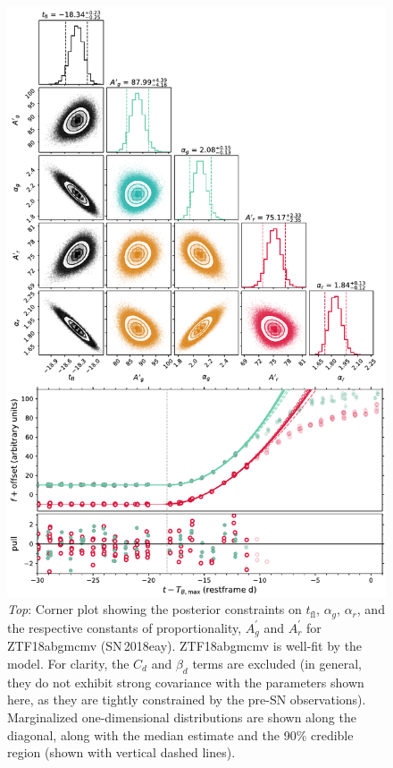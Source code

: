 \documentclass[twocolumn]{./aastex63}
\newcommand{\tfl}{$t_\mathrm{fl}$}
\begin{document}
\begin{figure}
    \centering
    \includegraphics[width=5.2in]{./figures/Fig1.pdf}
    \caption{\textit{Top}: Corner plot showing the posterior constraints on
    \tfl, $\alpha_g$, $\alpha_r$, and the respective constants of
    proportionality, $A_g^\prime$ and $A_r^\prime$ for ZTF18abgmcmv
    (SN\,2018eay). ZTF18abgmcmv is well-fit by the model. For clarity, the
    $C_d$ and $\beta_d$ terms are excluded (in general, they do not exhibit
    strong covariance with the parameters shown here, as they are tightly
    constrained by the pre-SN observations). Marginalized one-dimensional
    distributions are shown along the diagonal, along with the median estimate
    and the 90\% credible region (shown with vertical dashed lines).
}
\end{figure}
\end{document}
